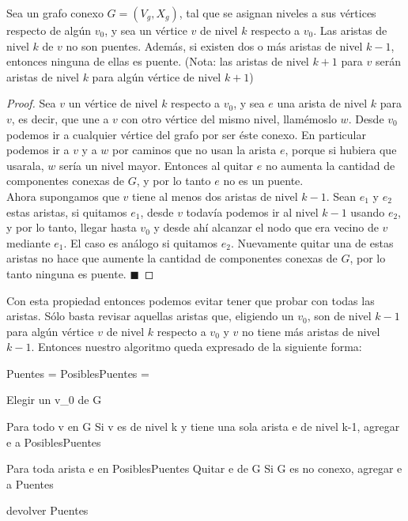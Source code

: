 \begin{proposition}
Sea un grafo conexo $G=(V_g, X_g)$, tal que se asignan niveles a sus vértices respecto de algún $v_0$, y sea un vértice $v$ de nivel $k$ respecto a $v_0$. Las aristas de nivel $k$ de $v$ no son puentes. 
Además, si existen dos o más aristas de nivel $k-1$, entonces ninguna de ellas es puente. (Nota: las aristas de nivel $k+1$ para $v$ serán aristas de nivel $k$ para algún vértice de nivel $k+1$)
\end{proposition}

\begin{proof}
Sea $v$ un vértice de nivel $k$ respecto a $v_0$, y sea $e$ una arista de nivel $k$ para $v$, es decir, que une a $v$ con otro vértice del mismo nivel, llamémoslo $w$. Desde $v_0$ podemos ir a cualquier 
vértice del grafo por ser éste conexo. En particular podemos ir a $v$ y a $w$ por caminos que no usan la arista $e$, porque si hubiera que usarala, $w$ sería un nivel mayor. Entonces al quitar 
$e$ no aumenta la cantidad de componentes conexas de $G$, y por lo tanto $e$ no es un puente. \\
Ahora supongamos que $v$ tiene al menos dos aristas de nivel $k-1$. Sean $e_1$ y $e_2$ estas aristas, si quitamos $e_1$, desde $v$ todavía podemos ir al nivel $k-1$ usando $e_2$, y por 
lo tanto, llegar hasta $v_0$ y desde ahí alcanzar el nodo que era vecino de $v$ mediante $e_1$. El caso es análogo si quitamos $e_2$. Nuevamente quitar una de estas aristas no hace que aumente 
la cantidad de componentes conexas de $G$, por lo tanto ninguna es puente. $\blacksquare$ 
\end{proof}

Con esta propiedad entonces podemos evitar tener que probar con todas las aristas. Sólo basta revisar aquellas aristas que, eligiendo un $v_0$, son de nivel $k-1$ para algún vértice $v$ de nivel 
$k$ respecto a $v_0$ y $v$ no tiene más aristas de nivel $k-1$. Entonces nuestro algoritmo queda expresado de la siguiente forma:

\begin{verbatimtab}
Puentes 	= {}
PosiblesPuentes = {}

Elegir un v_0 de G

Para todo v en G
    Si v es de nivel k y tiene una sola arista e de nivel k-1, agregar e a PosiblesPuentes

Para toda arista e en PosiblesPuentes
    Quitar e de G
    Si G es no conexo, agregar e a Puentes

devolver Puentes
\end{verbatimtab}


